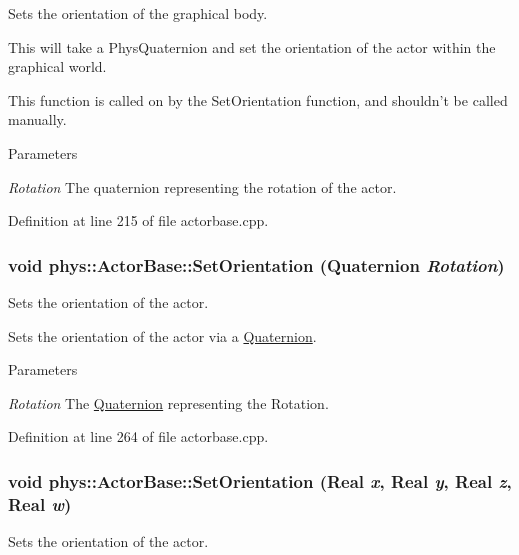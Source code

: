 Sets the orientation of the graphical body. 

This will take a PhysQuaternion and set the orientation of the actor within the graphical world. \par
 This function is called on by the SetOrientation function, and shouldn't be called manually. 
\begin{DoxyParams}{Parameters}
\item[{\em Rotation}]The quaternion representing the rotation of the actor. \end{DoxyParams}


Definition at line 215 of file actorbase.cpp.

\hypertarget{classphys_1_1ActorBase_ac4b0bf1eff730d94f72d04957efea69d}{
\subsubsection[{SetOrientation}]{\setlength{\rightskip}{0pt plus 5cm}void phys::ActorBase::SetOrientation ({\bf Quaternion} {\em Rotation})}}
\label{d8/d0f/classphys_1_1ActorBase_ac4b0bf1eff730d94f72d04957efea69d}


Sets the orientation of the actor. 

Sets the orientation of the actor via a \hyperlink{classphys_1_1Quaternion}{Quaternion}. 
\begin{DoxyParams}{Parameters}
\item[{\em Rotation}]The \hyperlink{classphys_1_1Quaternion}{Quaternion} representing the Rotation. \end{DoxyParams}


Definition at line 264 of file actorbase.cpp.

\hypertarget{classphys_1_1ActorBase_adbf0cc77031f22597a799fd0f7f8216d}{
\subsubsection[{SetOrientation}]{\setlength{\rightskip}{0pt plus 5cm}void phys::ActorBase::SetOrientation ({\bf Real} {\em x}, \/  {\bf Real} {\em y}, \/  {\bf Real} {\em z}, \/  {\bf Real} {\em w})}}
\label{d8/d0f/classphys_1_1ActorBase_adbf0cc77031f22597a799fd0f7f8216d}


Sets the orientation of the actor. 

